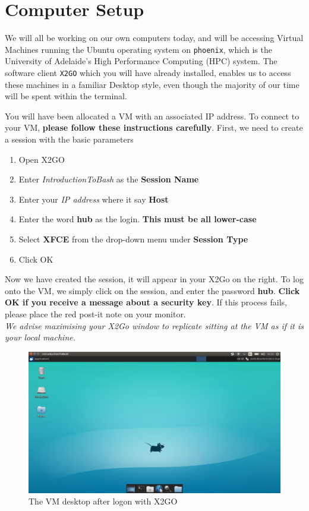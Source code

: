 \section{Computer Setup}
\begin{information}
We will all be working on our own computers today, and will be accessing Virtual Machines running the Ubuntu operating system on \texttt{phoenix}, which is the University of Adelaide's High Performance Computing (HPC) system.
The software client \texttt{X2GO} which you will have already installed, enables us to access these machines in a familiar Desktop style, even though the majority of our time will be spent within the terminal. \\
\end{information}

You will have been allocated a VM with an associated IP address.
To connect to your VM, \textbf{please follow these instructions carefully}.
First, we need to create a session with the basic parameters
\begin{enumerate}
	\item Open X2GO
	\item Enter \textit{IntroductionToBash} as the \textbf{Session Name}
	\item Enter your \textit{IP address} where it say \textbf{Host}
	\item Enter the word \textbf{hub} as the login. \textbf{This must be all lower-case}
	\item Select \textbf{XFCE} from the drop-down menu under \textbf{Session Type}
	\item Click OK
\end{enumerate}

Now we have created the session, it will appear in your X2Go on the right.
To log onto the VM, we simply click on the session, and enter the password \textbf{hub}.
\textbf{Click OK if you receive a message about a security key}.
If this process fails, please place the red post-it note on your monitor.\\

\textit{We advise maximising your X2Go window to replicate sitting at the VM as if it is your local machine.}

\begin{figure}[ht]
	\centering
	\includegraphics[width=0.9\linewidth]{images/xfceDesktop.png} 
	\caption{The VM desktop after logon with X2GO}
\end{figure}


